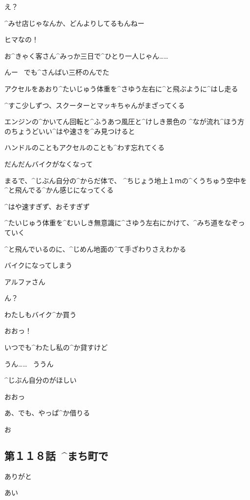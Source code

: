 \Makki え？

\Alpha ^{みせ}{店}じゃなんか、どんよりしてるもんねー

\Makki ヒマなの！

\Makki お^{きゃく}{客}さん^{みっか}{三日}で^{ひとり}{一人}じゃん……

\Alpha んー
\ でも^{さんばい}{三杯}のんでた

\page[96]
\Alpha アクセルをあおり^{たいじゅう}{体重}を^{さゆう}{左右}に^{と}{飛}ぶように^{はし}{走}る

\Alpha ^{すこ}{少}しずつ、スクーターとマッキちゃんがまざってくる

\page[97]
\Makki エンジンの^{かいてん}{回転}と^{ふうあつ}{風圧}と^{けしき}{景色}の
^{なが}{流}れ^{ほう}{方}のちょうどいい^{はや}{速}さを^{み}{見}つけると

\Makki ハンドルのこともアクセルのことも^{わす}{忘}れてくる

\Makki だんだんバイクがなくなって

\Makki まるで、^{じぶん}{自分}の^{からだ}{体}で、
^{ちじょう}{地上}１ｍの^{くうちゅう}{空中}を^{と}{飛}んでる^{かん}{感}じになってくる

\page[98]
\Makki ^{はや}{速}すぎず、おそすぎず

\Makki ^{たいじゅう}{体重}を^{むいしき}{無意識}に^{さゆう}{左右}にかけて、^{みち}{道}をなぞっていく

\Makki ^{と}{飛}んでいるのに、^{じめん}{地面}の^{て}{手}ざわりさえわかる

\Makki バイクになってしまう

\page[99]
\Makki アルファさん

\Alpha ん？

\Makki わたしもバイク^{か}{買}う

\Alpha おおっ！

\Alpha いつでも^{わたし}{私}の^{か}{貸}すけど

\Makki うん……
\ ううん

\Makki ^{じぶん}{自分}のがほしい

\Alpha おおっ

\page[100]
\Makki あ、でも、やっぱ^{か}{借}りる

\Alpha お


\subsection{第１１８話\ ^{まち}{町}で}

\page[102]
\Alpha ありがと

\Person あい

